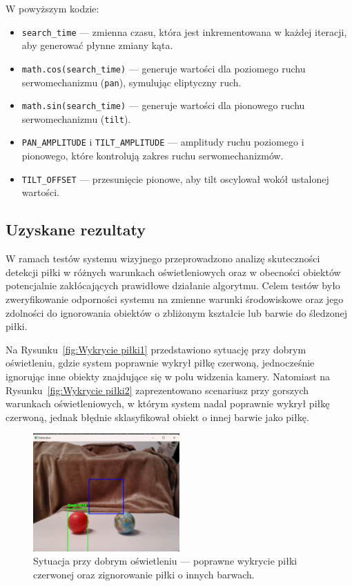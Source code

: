 \documentclass[a4paper,twoside,12pt]{book}
\begin{document}
W powyższym kodzie:
\begin{itemize}
    \item \texttt{search\_time} — zmienna czasu, która jest inkrementowana w każdej iteracji, aby generować płynne zmiany kąta.
    \item \texttt{math.cos(search\_time)} — generuje wartości dla poziomego ruchu serwomechanizmu (\texttt{pan}), symulując eliptyczny ruch.
    \item \texttt{math.sin(search\_time)} — generuje wartości dla pionowego ruchu serwomechanizmu (\texttt{tilt}).
    \item \texttt{PAN\_AMPLITUDE} i \texttt{TILT\_AMPLITUDE} — amplitudy ruchu poziomego i pionowego, które kontrolują zakres ruchu serwomechanizmów.
    \item \texttt{TILT\_OFFSET} — przesunięcie pionowe, aby tilt oscylował wokół ustalonej wartości.
\end{itemize}

\newpage
\subsection{Uzyskane rezultaty}
W ramach testów systemu wizyjnego przeprowadzono analizę skuteczności detekcji piłki w różnych warunkach oświetleniowych oraz w obecności obiektów potencjalnie zakłócających prawidłowe działanie algorytmu. Celem testów było zweryfikowanie odporności systemu na zmienne warunki środowiskowe oraz jego zdolności do ignorowania obiektów o zbliżonym kształcie lub barwie do śledzonej piłki.

Na Rysunku~\ref{fig:Wykrycie piłki1} przedstawiono sytuację przy dobrym oświetleniu, gdzie system poprawnie wykrył piłkę czerwoną, jednocześnie ignorując inne obiekty znajdujące się w polu widzenia kamery. Natomiast na Rysunku~\ref{fig:Wykrycie piłki2} zaprezentowano scenariusz przy gorszych warunkach oświetleniowych, w którym system nadal poprawnie wykrył piłkę czerwoną, jednak błędnie sklasyfikował obiekt o innej barwie jako piłkę.

\begin{figure}[!hb]
    \centering
    \includegraphics[width=0.5\textwidth]{Images/Porownanie/Yolo7 robot/Zrzut ekranu 2025-01-02 194147.png}
    \caption{Sytuacja przy dobrym oświetleniu — poprawne wykrycie piłki czerwonej oraz zignorowanie piłki o innych barwach.}
    \label{fig:Wykrycie_piłki1}
\end{figure}
\end{document}

